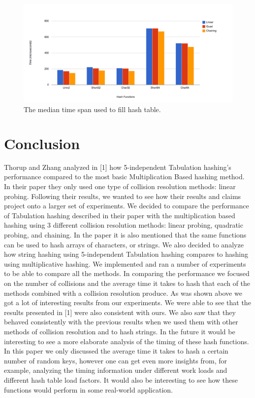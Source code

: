 \documentclass[11pt]{article}
\begin{document}
\begin{figure}
                \centering
                \includegraphics[width=\textwidth]{time-median.png}
              \caption{The median time span used to fill hash table.}
              \label{fig:timemedian}
\end{figure}




\section{Conclusion}
Thorup and Zhang analyzed in [1] how 5-independent Tabulation hashing's performance compared to the most basic Multiplication Based hashing method. In their paper they only used one type of collision resolution methods: linear probing. Following their results, we wanted to see how their results and claims project onto a larger set of experiments. We decided to compare the performance of Tabulation hashing described in their paper with the multiplication based hashing using 3 different collision resolution methods: linear probing, quadratic probing, and chaining. In the paper it is also mentioned that the same functions can be used to hash arrays of characters, or strings. We also decided to analyze how string hashing using 5-independent Tabulation hashing compares to hashing using multiplicative hashing. We implemented and ran a number of experiments to be able to compare all the methods. In comparing the performance we focused on the number of collisions and the average time it takes to hash that each of the methods combined with a collision resolution produce. 
As was shown above we got a lot of interesting results from our experiments. We were able to see that the results presented in [1] were also consistent with ours. We also saw that they behaved consistently with the previous results when we used them with other methods of collision resolution and to hash strings. In the future it would be interesting to see a more elaborate analysis of the timing of these hash functions. In this paper we only discussed the average time it takes to hash a certain number of random keys, however one can get even more insights from, for example, analyzing the timing information under different work loads and different hash table load factors. It would also be interesting to see how these functions would perform in some real-world application. 
\end{document}
